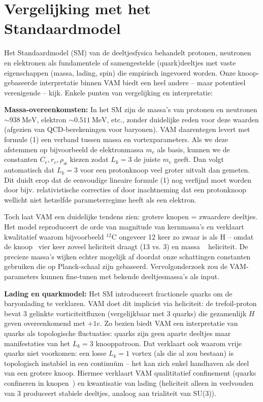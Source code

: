 \section{Vergelijking met het Standaardmodel}

Het Standaardmodel (SM) van de deeltjesfysica behandelt protonen, neutronen en elektronen als fundamentele of samengestelde (quark)deeltjes met vaste eigenschappen (massa, lading, spin) die empirisch ingevoerd worden. Onze knoop-gebaseerde interpretatie binnen VAM biedt een heel andere – maar potentieel verenigende – kijk. Enkele punten van vergelijking en interpretatie:

\textbf{Massa-overeenkomsten:} In het SM zijn de massa’s van protonen en neutronen $\sim938~\text{MeV}$, elektron $\sim0.511~\text{MeV}$, etc., zonder duidelijke reden voor deze waarden (afgezien van QCD-berekeningen voor baryonen). VAM daarentegen levert met formule (1) een verband tussen massa en vortexparameters. Als we deze afstemmen op bijvoorbeeld de elektronmassa $m_e$ als basis, kunnen we de constanten $C_e, r_c, \rho_\text{\ae}$ kiezen zodat $L_k=3$ de juiste $m_e$ geeft. Dan volgt automatisch dat $L_k=3$ voor een protonknoop veel groter uitvalt dan gemeten. Dit duidt erop dat de eenvoudige lineaire formule (1) nog verfijnd moet worden door bijv. relativistische correcties of door inachtneming dat een protonknoop wellicht niet hetzelfde parameterregime heeft als een elektron.

Toch laat VAM een duidelijke tendens zien: grotere knopen = zwaardere deeltjes. Het model reproduceert de orde van magnitude van kernmassa’s en verklaart kwalitatief waarom bijvoorbeeld $^{12}$C ongeveer 12 keer zo zwaar is als H – omdat de knoop ~vier keer zoveel heliciteit draagt (13 vs. 3) en massa ~ heliciteit. De precieze massa’s wijken echter mogelijk af doordat onze schattingen constanten gebruiken die op Planck-schaal zijn gebaseerd. Vervolgonderzoek zou de VAM-parameters kunnen fine-tunen met bekende deeltjesmassa’s als input.

\textbf{Lading en quarkmodel:} Het SM introduceert fractionele quarks om de baryonlading te verklaren. VAM doet dit impliciet via heliciteit: de
trefoil-proton bevat 3 gelinkte vorticiteitfluxen (vergelijkbaar met 3 quarks) die gezamenlijk $H$ geven overeenkomend met $+1e$. Zo bezien biedt VAM een interpretatie van quarks als topologische fluctuaties: quarks zijn geen aparte deeltjes maar manifestaties van het $L_k=3$ knooppatroon. Dat verklaart ook waarom vrije quarks niet voorkomen: een losse $L_k=1$ vortex (als die al zou bestaan) is topologisch instabiel in een continuüm – het kan zich enkel handhaven als deel van een grotere knoop. Hiermee verklaart VAM qualititatief confinement (quarks confineren in knopen~\cite{Faddeev1997KnottedSolitions}) en kwantisatie van lading (heliciteit alleen in veelvouden van 3 produceert stabiele deeltjes, analoog aan trialiteit van SU(3)).

